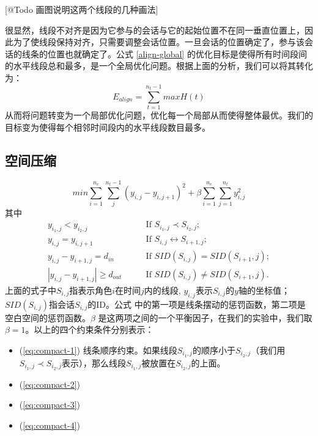 [@Todo 画图说明这两个线段的几种画法]

很显然，线段不对齐是因为它参与的会话与它的起始位置不在同一垂直位置上，因此为了使线段保持对齐，只需要调整会话位置。一旦会话的位置确定了，参与该会话的线条的位置也就确定了。公式 \ref{align-global} 的优化目标是使得所有时间段间的水平线段总和最多，是一个全局优化问题。根据上面的分析，我们可以将其转化为：
\begin{equation}
\label{align-local}
E_{align} = \sum_{t=1}^{n_t-1} max H\left(t\right)
\end{equation}
从而将问题转变为一个局部优化问题，优化每一个局部从而使得整体最优。我们的目标变为使得每个相邻时间段内的水平线段数目最多。

\subsection{空间压缩} 
\begin{equation}
min \sum_{i=1}^{n_e} \sum_j^{n_t-1} \left(y_{i,j} - y_{i, j+1} \right)^2 + \beta \sum_{i=1}^{n_e} \sum_{j=1}^{n_t} y_{i,j}^2
\end{equation}
\label{eq:compact}
其中
\begin{subequations}
\begin{align}
	y_{i_1,j} < y_{i_2, j} & \qquad \text{If  } S_{i_1,j} \prec S_{i_2,j}; \label{eq:compact-1}\\
	y_{i,j} = y_{i,j+1} & \qquad \text{If  } S_{i,j} \leftrightarrow S_{i+1, j}; \label{eq:compact-2}\\
	y_{i,j} - y_{i+1,j} = d_{in} & \qquad \text{If  } SID(S_{i,j}) = SID(S_{i+1}, j); \label{eq:compact-3}\\
	\left|y_{i,j} - y_{i+1,j}\right| \geq d_{out} & \qquad \text{If  } SID(S_{i,j}) \neq SID(S_{i+1}, j). \label{eq:compact-4}
\end{align}
\end{subequations}
上面的式子中$S_{i,j}$指表示角色$i$在时间$j$内的线段, $y_{i,j}$表示$S_{i,j}$的$y$轴的坐标值；$SID(S_{i,j})$指会话$S_{i,j}$的ID。公式 \label{eq:compact} 中的第一项是线条摆动的惩罚函数，第二项是空白空间的惩罚函数。$\beta$ 是这两项之间的一个平衡因子，在我们的实验中，我们取 $\beta = 1$。以上的四个约束条件分别表示：
\begin{itemize}
\item (\ref{eq:compact-1}) 线条顺序约束。如果线段$S_{i_1,j}$的顺序小于$S_{i_2,j}$（我们用$S_{i_1,j} \prec S_{i_2,j}$表示），那么线段$S_{i_1,j}$被放置在$S_{i_2,j}$的上面。
\item (\ref{eq:compact-2})
\item (\ref{eq:compact-3})
\item (\ref{eq:compact-4})
\end{itemize}









